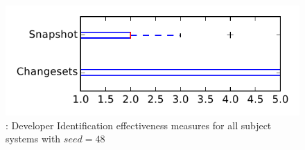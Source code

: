 
\begin{figure}
\centering
\includegraphics[height=0.4\textheight]{figures/dit_seed/rq1_tiny_48}
\caption{\rtwo: Developer Identification effectiveness measures for all subject systems with $seed=48$}
\label{fig:dit_seed:rq1:tiny}
\end{figure}
